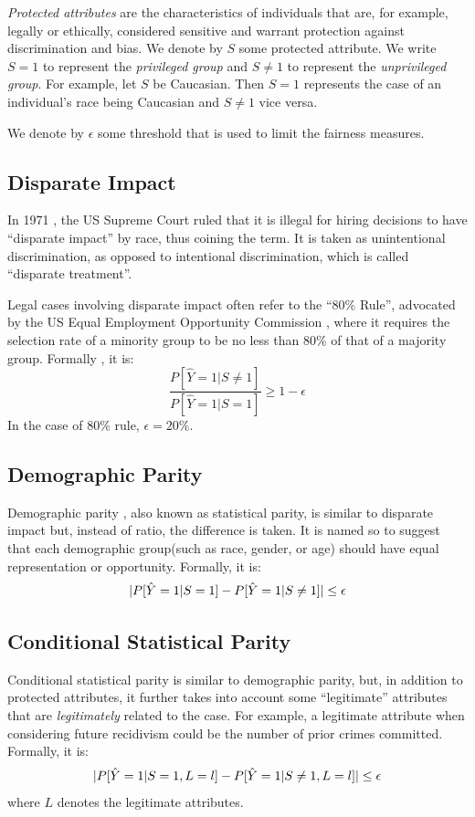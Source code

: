 \documentclass[conference]{IEEEtran}
\begin{document}
\emph{Protected attributes} are the characteristics of individuals that are, for example, legally or ethically, considered sensitive and warrant protection against discrimination and bias. We denote by $S$ some protected attribute. We write $S = 1$ to represent the \emph{privileged group} and $S \neq 1$ to represent the \emph{unprivileged group}. For example, let $S$ be Caucasian. Then $S = 1$ represents the case of an individual's race being Caucasian and $S \neq 1$ vice versa.

We denote by $\epsilon$ some threshold that is used to limit the fairness measures.

\subsection{Disparate Impact}
In 1971 \cite{griggs1971}, the US Supreme Court ruled that it is illegal for hiring decisions to have  ``disparate impact'' by race, thus coining the term. It is taken as unintentional discrimination, as opposed to intentional discrimination, which is called ``disparate treatment''.

Legal cases involving disparate impact often refer to the ``80\% Rule'', advocated by the US Equal Employment Opportunity Commission \cite{eeoc1979}, where it requires the selection rate of a minority group to be no less than 80\% of that of a majority group. Formally \cite{feldman2015certifying}, it is:
\[
    \frac{P[\hat{Y} = 1 | S \neq 1]}{P[\hat{Y} = 1 | S = 1]} \geq 1 - \epsilon
\]
In the case of 80\% rule, $\epsilon = 20\%$.

\subsection{Demographic Parity}
Demographic parity \cite{pessach2022review}, also known as statistical parity, is similar to disparate impact but, instead of ratio, the difference is taken. It is named so to suggest that each demographic group(such as race, gender, or age) should have equal representation or opportunity. Formally, it is:
\[
    \lvert P[\hat{Y} = 1 | S = 1] - P[\hat{Y} = 1 | S \neq 1]\rvert \leq \epsilon
\]

\subsection{Conditional Statistical Parity}
Conditional statistical parity \cite{corbett2017algorithmic} is similar to demographic parity, but, in addition to protected attributes, it further takes into account some ``legitimate'' attributes that are \textit{legitimately} related to the case. For example, a legitimate attribute when considering future recidivism could be the number of prior crimes committed. Formally, it is:
\[
    \lvert P[\hat{Y} = 1 | S = 1, L = l] - P[\hat{Y} = 1 | S \neq 1, L = l]\rvert \leq \epsilon
\]
where $L$ denotes the legitimate attributes.
\end{document}
